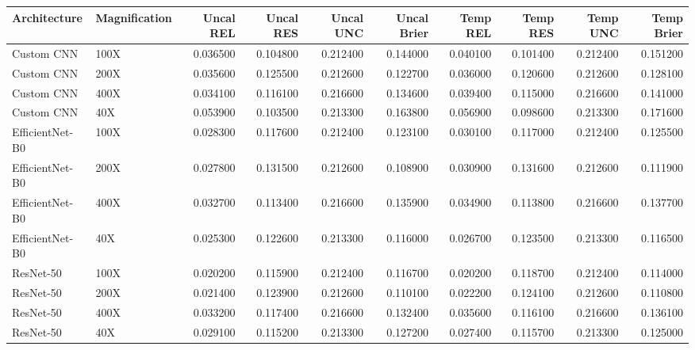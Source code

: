 \begin{tabular}{llrrrrrrrr}
\toprule
Architecture & Magnification & Uncal REL & Uncal RES & Uncal UNC & Uncal Brier & Temp REL & Temp RES & Temp UNC & Temp Brier \\
\midrule
Custom CNN & 100X & 0.036500 & 0.104800 & 0.212400 & 0.144000 & 0.040100 & 0.101400 & 0.212400 & 0.151200 \\
Custom CNN & 200X & 0.035600 & 0.125500 & 0.212600 & 0.122700 & 0.036000 & 0.120600 & 0.212600 & 0.128100 \\
Custom CNN & 400X & 0.034100 & 0.116100 & 0.216600 & 0.134600 & 0.039400 & 0.115000 & 0.216600 & 0.141000 \\
Custom CNN & 40X & 0.053900 & 0.103500 & 0.213300 & 0.163800 & 0.056900 & 0.098600 & 0.213300 & 0.171600 \\
EfficientNet-B0 & 100X & 0.028300 & 0.117600 & 0.212400 & 0.123100 & 0.030100 & 0.117000 & 0.212400 & 0.125500 \\
EfficientNet-B0 & 200X & 0.027800 & 0.131500 & 0.212600 & 0.108900 & 0.030900 & 0.131600 & 0.212600 & 0.111900 \\
EfficientNet-B0 & 400X & 0.032700 & 0.113400 & 0.216600 & 0.135900 & 0.034900 & 0.113800 & 0.216600 & 0.137700 \\
EfficientNet-B0 & 40X & 0.025300 & 0.122600 & 0.213300 & 0.116000 & 0.026700 & 0.123500 & 0.213300 & 0.116500 \\
ResNet-50 & 100X & 0.020200 & 0.115900 & 0.212400 & 0.116700 & 0.020200 & 0.118700 & 0.212400 & 0.114000 \\
ResNet-50 & 200X & 0.021400 & 0.123900 & 0.212600 & 0.110100 & 0.022200 & 0.124100 & 0.212600 & 0.110800 \\
ResNet-50 & 400X & 0.033200 & 0.117400 & 0.216600 & 0.132400 & 0.035600 & 0.116100 & 0.216600 & 0.136100 \\
ResNet-50 & 40X & 0.029100 & 0.115200 & 0.213300 & 0.127200 & 0.027400 & 0.115700 & 0.213300 & 0.125000 \\
\bottomrule
\end{tabular}
